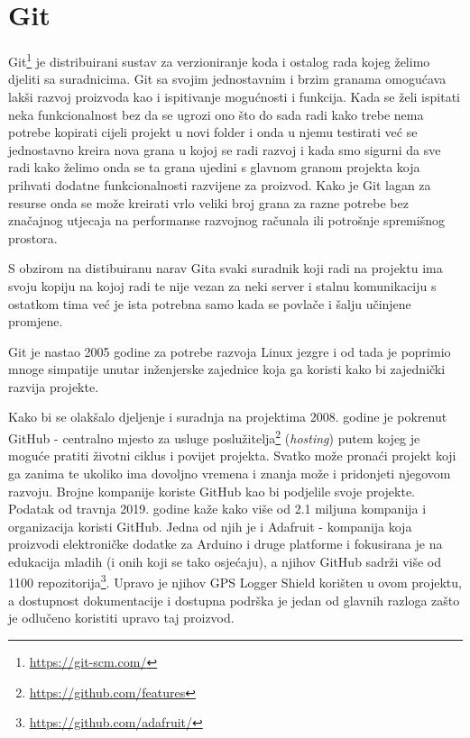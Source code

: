 \section{Git}
Git\footnote{\href{https://git-scm.com/}{https://git-scm.com/}} je distribuirani sustav za verzioniranje koda i ostalog rada kojeg želimo djeliti sa suradnicima.
Git sa svojim jednostavnim i brzim granama omogućava lakši razvoj proizvoda kao i ispitivanje mogućnosti i funkcija.
Kada se želi ispitati neka funkcionalnost bez da se ugrozi ono što do sada radi kako trebe nema potrebe kopirati cijeli projekt u novi folder i onda u njemu testirati već se jednostavno kreira nova grana u kojoj se radi razvoj i kada smo sigurni da sve radi kako želimo onda se ta grana ujedini s glavnom granom projekta koja prihvati dodatne funkcionalnosti razvijene za proizvod.
Kako je Git lagan za resurse onda se može kreirati vrlo veliki broj grana za razne potrebe bez značajnog utjecaja na performanse razvojnog računala ili potrošnje spremišnog prostora.

S obzirom na distibuiranu narav Gita svaki suradnik koji radi na projektu ima svoju kopiju na kojoj radi te nije vezan za neki server i stalnu komunikaciju s ostatkom tima već je ista potrebna samo kada se povlače i šalju učinjene promjene.

Git je nastao 2005 godine za potrebe razvoja Linux jezgre i od tada je poprimio mnoge simpatije unutar inženjerske zajednice koja ga koristi kako bi zajednički razvija projekte.

Kako bi se olakšalo djeljenje i suradnja na projektima 2008. godine je pokrenut GitHub - centralno mjesto za usluge poslužitelja\footnote{\href{https://github.com/features}{https://github.com/features}} (\textit{hosting}) putem kojeg je moguće pratiti životni ciklus i povijet projekta.
Svatko može pronaći projekt koji ga zanima te ukoliko ima dovoljno vremena i znanja može i pridonjeti njegovom razvoju.
Brojne kompanije koriste GitHub kao bi podjelile svoje projekte. Podatak od travnja 2019. godine kaže kako više od 2.1 miljuna kompanija i organizacija koristi GitHub.
Jedna od njih je i Adafruit - kompanija koja proizvodi elektroničke dodatke za Arduino i druge platforme i fokusirana je na edukacija mladih (i onih koji se tako osjećaju), a njihov GitHub sadrži više od 1100 repozitorija\footnote{\href{https://github.com/adafruit}{https://github.com/adafruit/}}.
Upravo je njihov GPS Logger Shield korišten u ovom projektu, a dostupnost dokumentacije i dostupna podrška je jedan od glavnih razloga zašto je odlučeno koristiti upravo taj proizvod.
